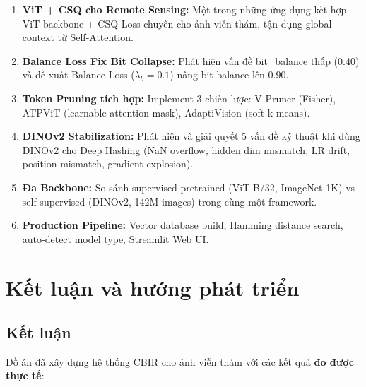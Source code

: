 \documentclass[13pt,a4paper]{article}
\begin{document}
\begin{enumerate}[label=\textbf{\arabic*.}]
    \item \textbf{ViT + CSQ cho Remote Sensing:} Một trong những ứng dụng kết hợp ViT backbone + CSQ Loss chuyên cho ảnh viễn thám, tận dụng global context từ Self-Attention.
    
    \item \textbf{Balance Loss Fix Bit Collapse:} Phát hiện vấn đề bit\_balance thấp (0.40) và đề xuất Balance Loss ($\lambda_b = 0.1$) nâng bit balance lên 0.90.
    
    \item \textbf{Token Pruning tích hợp:} Implement 3 chiến lược: V-Pruner (Fisher), ATPViT (learnable attention mask), AdaptiVision (soft k-means).
    
    \item \textbf{DINOv2 Stabilization:} Phát hiện và giải quyết 5 vấn đề kỹ thuật khi dùng DINOv2 cho Deep Hashing (NaN overflow, hidden dim mismatch, LR drift, position mismatch, gradient explosion).
    
    \item \textbf{Đa Backbone:} So sánh supervised pretrained (ViT-B/32, ImageNet-1K) vs self-supervised (DINOv2, 142M images) trong cùng một framework.
    
    \item \textbf{Production Pipeline:} Vector database build, Hamming distance search, auto-detect model type, Streamlit Web UI.
\end{enumerate}

\section{Kết luận và hướng phát triển}

\subsection{Kết luận}

Đồ án đã xây dựng hệ thống CBIR cho ảnh viễn thám với các kết quả \textbf{đo được thực tế}:
\end{document}

